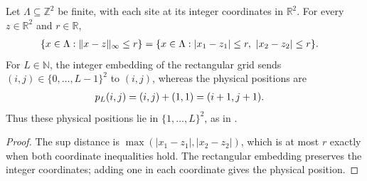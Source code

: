 \begin{theorem}
    \label{thm:peps_square_integer_coordinates}
    Let $\Lambda\subseteq\mathbb Z^2$ be finite, with each site at its integer
    coordinates in $\mathbb R^2$. For every $z\in\mathbb R^2$ and $r\in\mathbb R$,
    \begin{align}
        \{x\in\Lambda:\|x-z\|_\infty\leq r\}
         & =\{x\in\Lambda:|x_1-z_1|\leq r,\ |x_2-z_2|\leq r\}. \notag
    \end{align}
    For $L\in\mathbb N$, the integer embedding of the rectangular grid sends
    $(i,j)\in\{0,\ldots,L-1\}^2$ to $(i,j)$, whereas the physical positions are
    \begin{align}
        p_L(i,j) & =(i,j)+(1,1)=(i+1,j+1). \notag
    \end{align}
    Thus these physical positions lie in $\{1,\ldots,L\}^2$, as in
    \cite{OpenAI2026PolynomialPEPS}.
\end{theorem}
\begin{proof}
    The sup distance is $\max(|x_1-z_1|,|x_2-z_2|)$, which is at most $r$
    exactly when both coordinate inequalities hold.
    The rectangular embedding preserves the integer coordinates; adding one
    in each coordinate gives the physical position.
\end{proof}
